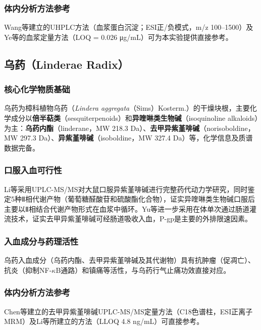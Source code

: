 \documentclass[12pt,a4paper,UTF8,openany]{ctexbook}
\newcommand{\compoundname}[1]{\textbf{#1}}
\newcommand{\herbname}[1]{\textit{#1}}
\begin{document}
\subsubsection{体内分析方法参考}

Wang等\cite{WangF2018}建立的UHPLC方法（血浆蛋白沉淀；ESI正/负模式，m/z 100--1500）及Ye等\cite{Ye2013}的血浆定量方法（LOQ = 0.026 μg/mL）可为本实验提供直接参考。

\subsection{乌药（Linderae Radix）}

\subsubsection{核心化学物质基础}

乌药为樟科植物乌药（\herbname{Lindera aggregata}（Sims）Kosterm.）的干燥块根，主要化学成分以\textbf{倍半萜类}（sesquiterpenoids）和\textbf{异喹啉类生物碱}（isoquinoline alkaloids）为主：\compoundname{乌药内酯}（linderane，MW 218.3 Da）、\compoundname{去甲异紫堇啡碱}（norisoboldine，MW 297.3 Da）、\compoundname{异紫堇啡碱}（isoboldine，MW 327.4 Da）等，化学信息及质谱数据完备\cite{Lv2023}。

\subsubsection{口服入血可行性}

Li等\cite{Li2015W}采用UPLC-MS/MS对大鼠口服异紫堇啡碱进行完整药代动力学研究，同时鉴定5种Ⅱ相代谢产物（葡萄糖醛酸苷和硫酸酯化合物），证实异喹啉类生物碱口服后主要以Ⅱ相结合代谢产物形式在血浆中循环。Yu等\cite{Dai2017}进一步采用在体单次通过肠道灌流技术，证实去甲异紫堇啡碱可经肠道吸收入血，P-gp是主要的外排限速因素。

\subsubsection{入血成分与药理活性}

乌药入血成分（乌药内酯、去甲异紫堇啡碱及其代谢物）具有抗肿瘤（促凋亡）、抗炎（抑制NF-$\kappa$B通路）和镇痛等活性，与乌药行气止痛功效直接对应\cite{Tong2015}。

\subsubsection{体内分析方法参考}

Chen等\cite{Chen2011W}建立的去甲异紫堇啡碱UPLC-MS/MS定量方法（C18色谱柱，ESI正离子MRM）及Li等\cite{Li2015W}所建立的方法（LLOQ 4.8 ng/mL）可直接参考。
\end{document}

